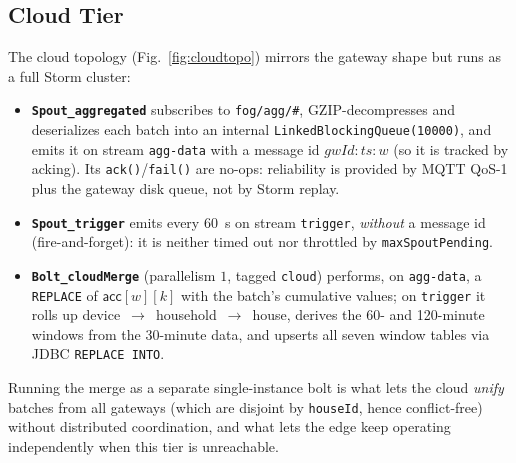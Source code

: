 \documentclass[conference]{IEEEtran}
\newcommand{\code}[1]{\texttt{#1}}
\begin{document}
\subsection{Cloud Tier}\label{sec:arch-cloud}
The cloud topology (Fig.~\ref{fig:cloudtopo}) mirrors the gateway shape but runs
as a full Storm cluster:

\begin{itemize}
\item \textbf{\code{Spout\_aggregated}} subscribes to \code{fog/agg/\#},
  GZIP-decompresses and deserializes each batch into an internal
  \code{LinkedBlockingQueue(10000)}, and emits it on stream \code{agg-data} with
  a message id $\textit{gwId}{:}\textit{ts}{:}w$ (so it is tracked by acking).
  Its \code{ack()}/\code{fail()} are no-ops: reliability is provided by MQTT QoS-1
  plus the gateway disk queue, not by Storm replay.
\item \textbf{\code{Spout\_trigger}} emits every \SI{60}{\second} on stream
  \code{trigger}, \emph{without} a message id (fire-and-forget): it is neither
  timed out nor throttled by \code{maxSpoutPending}.
\item \textbf{\code{Bolt\_cloudMerge}} (parallelism $1$, tagged \code{cloud})
  performs, on \code{agg-data}, a \code{REPLACE} of $\textsf{acc}[w][k]$ with the
  batch's cumulative values; on \code{trigger} it rolls up
  device~$\to$~household~$\to$~house, derives the 60- and 120-minute windows from
  the 30-minute data, and upserts all seven window tables via JDBC
  \code{REPLACE INTO}.
\end{itemize}

Running the merge as a separate single-instance bolt is what lets the cloud
\emph{unify} batches from all gateways (which are disjoint by \code{houseId},
hence conflict-free) without distributed coordination, and what lets the edge
keep operating independently when this tier is unreachable.
\end{document}

